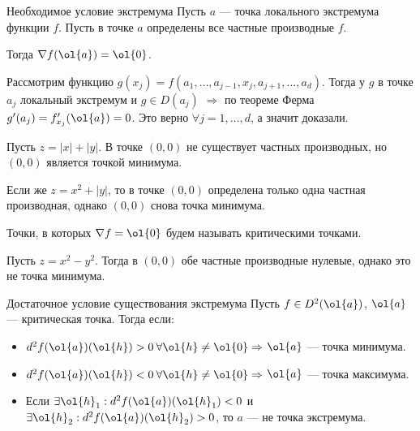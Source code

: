 \begin{thrm}{Необходимое условие экстремума}{}
    Пусть \( a \) --- точка локального экстремума функции \( f \).
    Пусть в точке \( a \) определены все частные производные \( f \).

    Тогда \( \nabla f (\ol{a}) = \ol{0} \).
\end{thrm}

Рассмотрим функцию \( g(x_j) = f(a_1, \ldots, a_{j - 1}, x_j, a_{j + 1}, \ldots, a_d) \).
Тогда у \( g \) в точке \( a_j \) локальный экстремум и \( g \in D(a_j) \)
\( \Rightarrow \) по теореме Ферма \( g'(a_j) = f_{x_j}'(\ol{a}) = 0 \).
Это верно \( \forall j = 1, \ldots, d \), а значит доказали.

\begin{example}{}{}
    Пусть \( z = |x| + |y| \).
    В точке \( (0, 0) \) не существует частных производных, но \( (0, 0) \) является точкой минимума.

    Если же \( z = x^2 + |y| \), то в точке \( (0, 0) \) определена только одна частная производная,
    однако \( (0, 0) \) снова точка минимума.
\end{example}

\begin{defn}{}{}
    Точки, в которых \( \nabla f = \ol{0} \) будем называть критическими точками.
\end{defn}

\begin{defn}{}{}
    Пусть \( z = x^2 - y^2 \). Тогда в \( (0, 0) \) обе частные производные нулевые,
    однако это не точка минимума.
\end{defn}

\begin{thrm}{Достаточное условие существования экстремума}{}
    Пусть \( f \in D^2 (\ol{a}) \), \( \ol{a} \) --- критическая точка.
    Тогда если:
    \begin{itemize}
        \item
            \( d^2 f(\ol{a}) (\ol{h}) > 0 \: \forall \ol{h} \neq \ol{0} \Rightarrow \) \( \ol{a} \) --- точка минимума.
        \item
            \( d^2 f(\ol{a}) (\ol{h}) < 0 \: \forall \ol{h} \neq \ol{0} \Rightarrow \) \( \ol{a} \) --- точка максимума.
        \item
            Если \( \exists \ol{h}_1 : d^2 f(\ol{a}) (\ol{h}_1) < 0 \)
            и \( \exists \ol{h}_2 : d^2 f(\ol{a}) (\ol{h}_2) > 0 \),
            то \( a \) --- не точка экстремума.
    \end{itemize}
\end{thrm}

